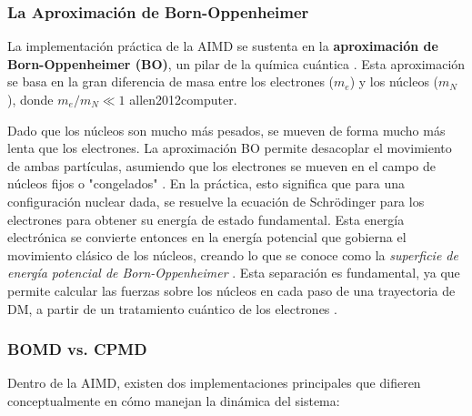 \subsubsection{La Aproximación de Born-Oppenheimer}
La implementación práctica de la AIMD se sustenta en la \textbf{aproximación de Born-Oppenheimer (BO)}, un pilar de la química cuántica \cite[58]{szabo1996modern}. Esta aproximación se basa en la gran diferencia de masa entre los electrones ($m_e$) y los núcleos ($m_N$), donde $m_e/m_N \ll 1$ \cite[58,213]{szabo1996modern}{allen2012computer}.

Dado que los núcleos son mucho más pesados, se mueven de forma mucho más lenta que los electrones. La aproximación BO permite desacoplar el movimiento de ambas partículas, asumiendo que los electrones se mueven en el campo de núcleos fijos o "congelados" \cite[58]{szabo1996modern}. En la práctica, esto significa que para una configuración nuclear dada, se resuelve la ecuación de Schrödinger para los electrones para obtener su energía de estado fundamental. Esta energía electrónica se convierte entonces en la energía potencial que gobierna el movimiento clásico de los núcleos, creando lo que se conoce como la \textit{superficie de energía potencial de Born-Oppenheimer} \cite[213]{allen2012computer}. Esta separación es fundamental, ya que permite calcular las fuerzas sobre los núcleos en cada paso de una trayectoria de DM, a partir de un tratamiento cuántico de los electrones \cite[R1300]{MD-2002-01}.

\subsubsection{BOMD vs. CPMD}
Dentro de la AIMD, existen dos implementaciones principales que difieren conceptualmente en cómo manejan la dinámica del sistema:

